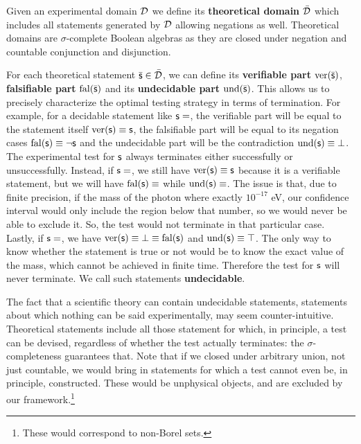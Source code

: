 \documentclass[letterpaper]{article}
\begin{document}
Given an experimental domain $\mathcal{D}$ we define its \textbf{theoretical domain} $\bar{\mathcal{D}}$ which includes all statements generated by $\mathcal{D}$ allowing negations as well. Theoretical domains are $\sigma$-complete Boolean algebras as they are closed under negation and countable conjunction and disjunction.

For each theoretical statement $\bar{\mathsf{s}} \in \bar{\mathcal{D}}$, we can define its \textbf{verifiable part} $\operatorname{ver}(\bar{\mathsf{s}})$, \textbf{falsifiable part} $\operatorname{fal}(\bar{\mathsf{s}})$ and its \textbf{undecidable part} $\operatorname{und}(\bar{\mathsf{s}})$. This allows us to precisely characterize the optimal testing strategy in terms of termination. For example, for a decidable statement like $\mathsf{s}=$, the verifiable part will be equal to the statement itself $\operatorname{ver}(\mathsf{s}) \equiv \mathsf{s}$, the falsifiable part will be equal to its negation cases $\operatorname{fal}(\mathsf{s}) \equiv \neg\mathsf{s}$ and the undecidable part will be the contradiction $\operatorname{und}(\mathsf{s}) \equiv \bot$. The experimental test for $\mathsf{s}$ always terminates either successfully or unsuccessfully. Instead, if $\mathsf{s}=$, we still have $\operatorname{ver}(\mathsf{s}) \equiv \mathsf{s}$ because it is a verifiable statement, but we will have $\operatorname{fal}(\mathsf{s}) \equiv$ while $\operatorname{und}(\mathsf{s}) \equiv$. The issue is that, due to finite precision, if the mass of the photon where exactly $10^{-17}$ eV, our confidence interval would only include the region below that number, so we would never be able to exclude it. So, the test would not terminate in that particular case. Lastly, if $\mathsf{s}=$, we have $\operatorname{ver}(\mathsf{s}) \equiv \bot \equiv \operatorname{fal}(\mathsf{s})$ and $\operatorname{und}(\mathsf{s}) \equiv \top$. The only way to know whether the statement is true or not would be to know the exact value of the mass, which cannot be achieved in finite time. Therefore the test for $\mathsf{s}$ will never terminate. We call such statements \textbf{undecidable}.

The fact that a scientific theory can contain undecidable statements, statements about which nothing can be said experimentally, may seem counter-intuitive. Theoretical statements include all those statement for which, in principle, a test can be devised, regardless of whether the test actually terminates: the $\sigma$-completeness guarantees that. Note that if we closed under arbitrary union, not just countable, we would bring in statements for which a test cannot even be, in principle, constructed. These would be unphysical objects, and are excluded by our framework.\footnote{These would correspond to non-Borel sets.}
\end{document}
